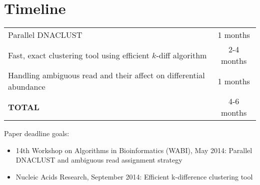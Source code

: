 \documentclass{article}
\begin{document}






%

\section{Timeline}

\begin{center}
\begin{tabular}{|l|c|}
\hline
Parallel DNACLUST & 1 months \\
Fast, exact clustering tool using efficient $k$-diff algorithm & 2-4 months \\
Handling ambiguous read and their affect on differential abundance & 1 months \\
\hline
\textbf{TOTAL} & 4-6 months \\
\hline
\end{tabular}
\end{center}

Paper deadline goals:

\begin{itemize}
\item 14th Workshop on Algorithms in Bioinformatics (WABI), May 2014: Parallel DNACLUST and ambiguous read assignment strategy
\item Nucleic Acids Research, September 2014: Efficient k-difference clustering tool
\end{itemize}
\end{document}
